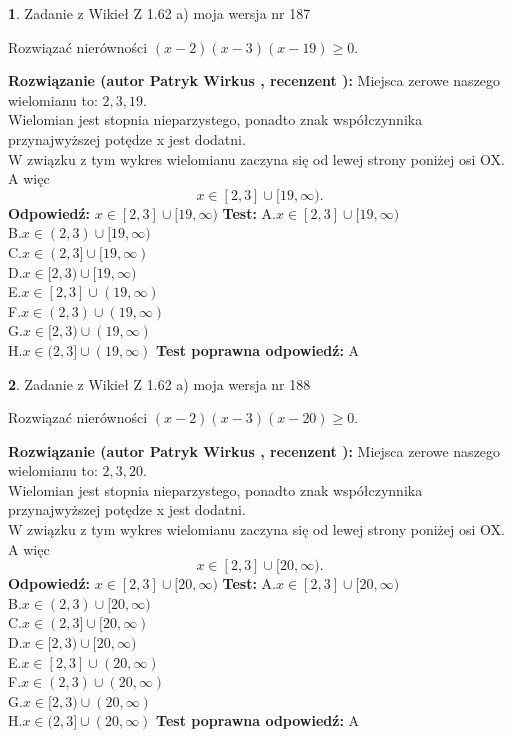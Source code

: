\documentclass[12pt, a4paper]{article}
\theoremstyle{definition} %
\newtheorem{zad}{}
\newcommand{\zadStart}[1]{\begin{zad}#1\newline}
\newcommand{\zadStop}{\end{zad}}
\newcommand{\rozwStart}[2]{\noindent \textbf{Rozwiązanie (autor #1 , recenzent #2): }\newline}
\newcommand{\rozwStop}{\newline}
\newcommand{\odpStart}{\noindent \textbf{Odpowiedź:}\newline}
\newcommand{\odpStop}{\newline}
\newcommand{\testStart}{\noindent \textbf{Test:}\newline}
\newcommand{\testStop}{\newline}
\newcommand{\kluczStart}{\noindent \textbf{Test poprawna odpowiedź:}\newline}
\newcommand{\kluczStop}{\newline}
\begin{document}
\zadStart{Zadanie z Wikieł Z 1.62 a) moja wersja nr 187}

Rozwiązać nierówności $(x-2)(x-3)(x-19)\ge0$.
\zadStop
\rozwStart{Patryk Wirkus}{}
Miejsca zerowe naszego wielomianu to: $2, 3, 19$.\\
Wielomian jest stopnia nieparzystego, ponadto znak współczynnika przy\linebreak najwyższej potędze x jest dodatni.\\ W związku z tym wykres wielomianu zaczyna się od lewej strony poniżej osi OX. A więc $$x \in [2,3] \cup [19,\infty).$$
\rozwStop
\odpStart
$x \in [2,3] \cup [19,\infty)$
\odpStop
\testStart
A.$x \in [2,3] \cup [19,\infty)$\\
B.$x \in (2,3) \cup [19,\infty)$\\
C.$x \in (2,3] \cup [19,\infty)$\\
D.$x \in [2,3) \cup [19,\infty)$\\
E.$x \in [2,3] \cup (19,\infty)$\\
F.$x \in (2,3) \cup (19,\infty)$\\
G.$x \in [2,3) \cup (19,\infty)$\\
H.$x \in (2,3] \cup (19,\infty)$
\testStop
\kluczStart
A
\kluczStop



\zadStart{Zadanie z Wikieł Z 1.62 a) moja wersja nr 188}

Rozwiązać nierówności $(x-2)(x-3)(x-20)\ge0$.
\zadStop
\rozwStart{Patryk Wirkus}{}
Miejsca zerowe naszego wielomianu to: $2, 3, 20$.\\
Wielomian jest stopnia nieparzystego, ponadto znak współczynnika przy\linebreak najwyższej potędze x jest dodatni.\\ W związku z tym wykres wielomianu zaczyna się od lewej strony poniżej osi OX. A więc $$x \in [2,3] \cup [20,\infty).$$
\rozwStop
\odpStart
$x \in [2,3] \cup [20,\infty)$
\odpStop
\testStart
A.$x \in [2,3] \cup [20,\infty)$\\
B.$x \in (2,3) \cup [20,\infty)$\\
C.$x \in (2,3] \cup [20,\infty)$\\
D.$x \in [2,3) \cup [20,\infty)$\\
E.$x \in [2,3] \cup (20,\infty)$\\
F.$x \in (2,3) \cup (20,\infty)$\\
G.$x \in [2,3) \cup (20,\infty)$\\
H.$x \in (2,3] \cup (20,\infty)$
\testStop
\kluczStart
A
\kluczStop
\end{document}
